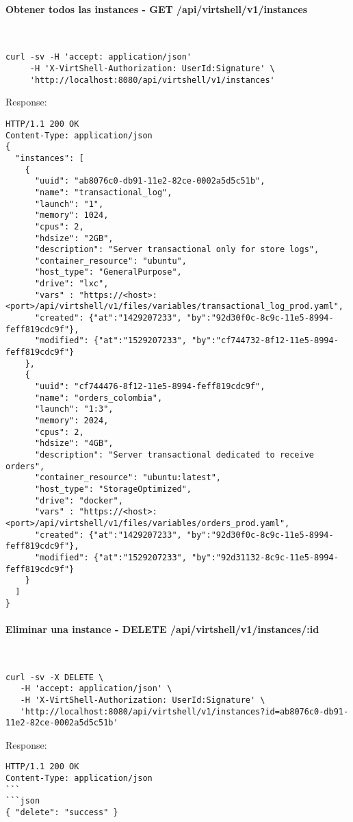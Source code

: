 \paragraph{Obtener todos las instances - GET /api/virtshell/v1/instances} ~\\

\begin{lstlisting}[style=json]
curl -sv -H 'accept: application/json' 
     -H 'X-VirtShell-Authorization: UserId:Signature' \ 
     'http://localhost:8080/api/virtshell/v1/instances'
\end{lstlisting}

Response:

\begin{lstlisting}[style=json]
HTTP/1.1 200 OK
Content-Type: application/json
{
  "instances": [
    {
      "uuid": "ab8076c0-db91-11e2-82ce-0002a5d5c51b",
      "name": "transactional_log",
      "launch": "1",
      "memory": 1024,
      "cpus": 2,
      "hdsize": "2GB",
      "description": "Server transactional only for store logs", 
      "container_resource": "ubuntu",
      "host_type": "GeneralPurpose",
      "drive": "lxc",
      "vars" : "https://<host>:<port>/api/virtshell/v1/files/variables/transactional_log_prod.yaml",
      "created": {"at":"1429207233", "by":"92d30f0c-8c9c-11e5-8994-feff819cdc9f"},
      "modified": {"at":"1529207233", "by":"cf744732-8f12-11e5-8994-feff819cdc9f"}
    },
    { 
      "uuid": "cf744476-8f12-11e5-8994-feff819cdc9f",
      "name": "orders_colombia",
      "launch": "1:3",
      "memory": 2024,
      "cpus": 2,
      "hdsize": "4GB",
      "description": "Server transactional dedicated to receive orders", 
      "container_resource": "ubuntu:latest",
      "host_type": "StorageOptimized",
      "drive": "docker",
      "vars" : "https://<host>:<port>/api/virtshell/v1/files/variables/orders_prod.yaml",
      "created": {"at":"1429207233", "by":"92d30f0c-8c9c-11e5-8994-feff819cdc9f"},
      "modified": {"at":"1529207233", "by":"92d31132-8c9c-11e5-8994-feff819cdc9f"}
    }    
  ]
}
\end{lstlisting}

\paragraph{Eliminar una instance - DELETE /api/virtshell/v1/instances/:id} ~\\

\begin{lstlisting}[style=json]
curl -sv -X DELETE \
   -H 'accept: application/json' \
   -H 'X-VirtShell-Authorization: UserId:Signature' \
   'http://localhost:8080/api/virtshell/v1/instances?id=ab8076c0-db91-11e2-82ce-0002a5d5c51b'
\end{lstlisting}

Response:

\begin{lstlisting}[style=json]
HTTP/1.1 200 OK
Content-Type: application/json
```
```json
{ "delete": "success" }
\end{lstlisting}